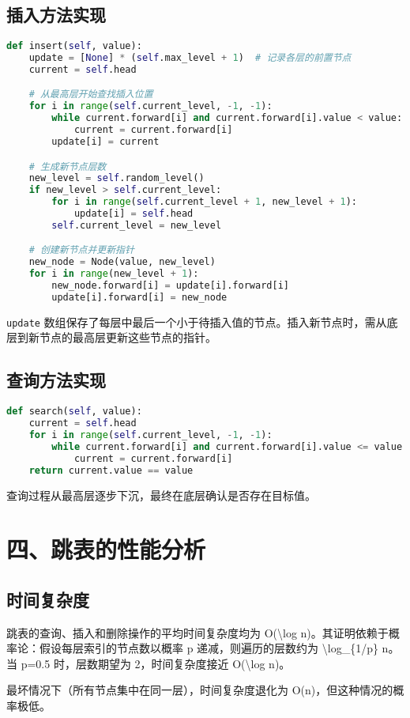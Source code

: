 \section{插入方法实现}
\begin{lstlisting}[language=python]
def insert(self, value):  
    update = [None] * (self.max_level + 1)  # 记录各层的前置节点  
    current = self.head  

    # 从最高层开始查找插入位置  
    for i in range(self.current_level, -1, -1):  
        while current.forward[i] and current.forward[i].value < value:  
            current = current.forward[i]  
        update[i] = current  

    # 生成新节点层数  
    new_level = self.random_level()  
    if new_level > self.current_level:  
        for i in range(self.current_level + 1, new_level + 1):  
            update[i] = self.head  
        self.current_level = new_level  

    # 创建新节点并更新指针  
    new_node = Node(value, new_level)  
    for i in range(new_level + 1):  
        new_node.forward[i] = update[i].forward[i]  
        update[i].forward[i] = new_node  
\end{lstlisting}
\verb!update! 数组保存了每层中最后一个小于待插入值的节点。插入新节点时，需从底层到新节点的最高层更新这些节点的指针。\par
\section{查询方法实现}
\begin{lstlisting}[language=python]
def search(self, value):  
    current = self.head  
    for i in range(self.current_level, -1, -1):  
        while current.forward[i] and current.forward[i].value <= value:  
            current = current.forward[i]  
    return current.value == value  
\end{lstlisting}
查询过程从最高层逐步下沉，最终在底层确认是否存在目标值。\par
\chapter{四、跳表的性能分析}
\section{时间复杂度}
跳表的查询、插入和删除操作的平均时间复杂度均为 O(\textbackslash{}log n)。其证明依赖于概率论：假设每层索引的节点数以概率 p 递减，则遍历的层数约为 \textbackslash{}log\_{}\{{}1/p\}{} n。当 p=0.5 时，层数期望为 2，时间复杂度接近 O(\textbackslash{}log n)。\par
最坏情况下（所有节点集中在同一层），时间复杂度退化为 O(n)，但这种情况的概率极低。\par
